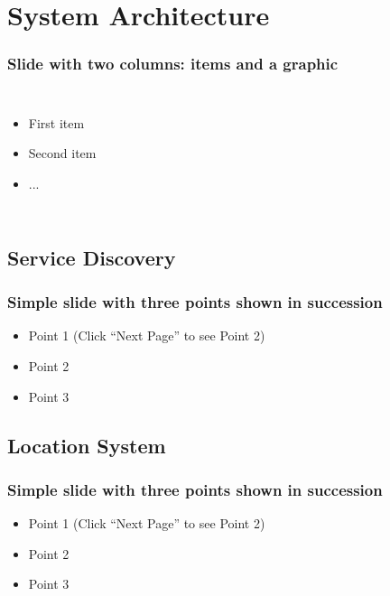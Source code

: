 \documentclass[]{beamer}
\begin{document}
\section{System Architecture}

\begin{frame}
  \frametitle{Slide with two columns: items and a graphic}   %
  \begin{columns}[c]
  \column{2in}  %
  \begin{itemize}
  \item<1-> First item
  \item<2-> Second item
  \item<3-> ...
  \end{itemize}
  \column{2in}
  \end{columns}
\end{frame}

\subsection{Service Discovery}

\begin{frame}
  \frametitle{Simple slide with three points shown in succession}   %

  \begin{itemize}
  \item<1-> Point 1 (Click ``Next Page'' to see Point 2) %
  \item<2-> Point 2  %
  \item<3-> Point 3
  \end{itemize}
\end{frame}

\subsection{Location System}

\begin{frame}
  \frametitle{Simple slide with three points shown in succession}   %

  \begin{itemize}
  \item<1-> Point 1 (Click ``Next Page'' to see Point 2) %
  \item<2-> Point 2  %
  \item<3-> Point 3
  \end{itemize}
\end{frame}
\end{document}
